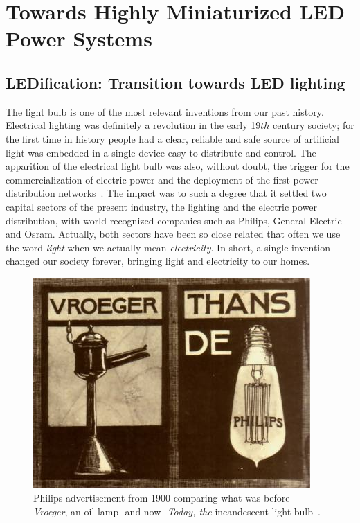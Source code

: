\part{Towards Highly Miniaturized LED Power Systems }
\label{ch:twrd_HMLED}

\chapter[LEDification]{LEDification: Transition towards LED lighting }


The light bulb is one of the most relevant inventions from our past history. Electrical lighting was definitely a revolution in the early 19${th}$ century society; for the first time in history people had a clear, reliable and safe source of artificial light was embedded in a single device easy to distribute and control. The apparition  of the electrical light bulb was also, without doubt, the trigger for the commercialization of electric power and the deployment of the first power distribution networks~\cite{14NYISO}. The impact was to such a degree that it settled two capital sectors of the present industry, the lighting and the electric power distribution, with  world recognized companies such as Philips, General Electric and Osram.  Actually, both sectors have been so close related that often we use the word \emph{light} when we actually mean \emph{electricity}. In short, a single invention changed our society forever, bringing light and electricity to our homes.

\begin{figure}[!h]
\centering
\includegraphics{./0_intro/img/1900-philips3.jpg}
\caption{Philips advertisement from 1900 comparing what was before -\emph{Vroeger}, an oil lamp- and now -\emph{Today, the} incandescent light bulb~\cite{lib:Philips}.}
\label{fig:incandescent_light_blub}
\end{figure}


